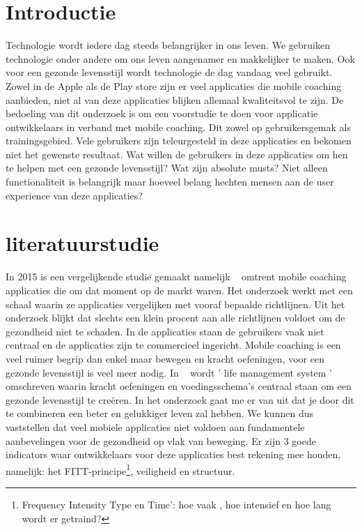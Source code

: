 
\section{Introductie} %
\label{sec:introductie}
Technologie wordt iedere dag steeds belangrijker in ons leven. We gebruiken technologie onder andere om ons leven aangenamer en makkelijker te maken. Ook voor een gezonde levensstijl wordt technologie de dag vandaag veel gebruikt. Zowel in de Apple als de Play store zijn er veel applicaties die mobile coaching aanbieden, niet al van deze applicaties blijken allemaal kwaliteitsvol te zijn. \hfill \break \break
De bedoeling van dit onderzoek is om een voorstudie te doen voor applicatie ontwikkelaars in verband met mobile coaching. Dit zowel op gebruikersgemak als trainingsgebied. Vele gebruikers zijn teleurgesteld in deze applicaties en bekomen niet het gewenste resultaat. Wat willen de gebruikers in deze applicaties om hen te helpen met een gezonde levensstijl? Wat zijn absolute musts? Niet alleen functionaliteit is belangrijk maar hoeveel belang hechten mensen aan de user experience van deze applicaties?



\section{literatuurstudie }
\label{sec:state-of-the-art}
In 2015 is een vergelijkende studie gemaakt namelijk ~\autocite{JMIR2015} omtrent mobile coaching applicaties die om dat moment op de markt waren. Het onderzoek werkt met een schaal waarin ze applicaties vergelijken met vooraf bepaalde richtlijnen. Uit het onderzoek blijkt dat slechts een klein procent aan alle richtlijnen voldoet om de gezondheid niet te schaden. In de applicaties staan de gebruikers vaak niet centraal en de applicaties zijn te commercieel ingericht. \break
\break
Mobile coaching is een veel ruimer begrip dan enkel maar bewegen en kracht oefeningen, voor een gezonde levensstijl is veel meer nodig. In ~\autocite{EQUILIBRIO2005} wordt ' life management system ' omschreven waarin kracht oefeningen en voedingsschema's centraal staan om een gezonde levensstijl te creëren. In het onderzoek gaat me er van uit dat je door dit te combineren een beter en gelukkiger leven zal hebben. \break
 \break
We kunnen dus vaststellen dat veel mobiele applicaties niet voldoen aan fundamentele aanbevelingen voor de gezondheid op vlak van beweging. Er zijn 3 goede indicators waar ontwikkelaars voor deze applicaties best rekening mee houden, namelijk: het FITT-principe\footnote{Frequency Intensity Type en Time’: hoe vaak , hoe intensief en hoe lang wordt er getraind?
}, veiligheid en structuur.

